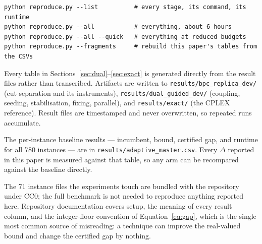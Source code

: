 \documentclass[11pt,a4paper]{article}
\begin{document}
\begin{verbatim}
python reproduce.py --list          # every stage, its command, its runtime
python reproduce.py --all           # everything, about 6 hours
python reproduce.py --all --quick   # everything at reduced budgets
python reproduce.py --fragments     # rebuild this paper's tables from the CSVs
\end{verbatim}

Every table in Sections~\ref{sec:dual}--\ref{sec:exact} is generated directly from
the result files rather than transcribed. Artifacts are written to
\texttt{results/bpc\_replica\_dev/} (cut separation and its instruments),
\texttt{results/dual\_guided\_dev/} (coupling, seeding, stabilisation, fixing,
parallel), and \texttt{results/exact/} (the CPLEX reference). Result files are
timestamped and never overwritten, so repeated runs accumulate.

The per-instance baseline results --- incumbent, bound, certified gap, and runtime
for all 780 instances --- are in \texttt{results/adaptive\_master.csv}. Every
$\Delta$ reported in this paper is measured against that table, so any arm can be
recompared against the baseline directly.

The 71 instance files the experiments touch are bundled with the repository under
CC0; the full benchmark is not needed to reproduce anything reported here.
Repository documentation covers setup, the meaning of every result column, and the
integer-floor convention of Equation~\eqref{eq:gap}, which is the single most
common source of misreading: a technique can improve the real-valued bound and
change the certified gap by nothing.
\end{document}
